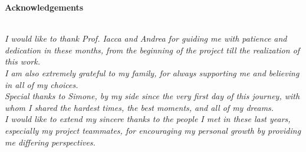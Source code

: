 \thispagestyle{empty}

\begin{center}
  {\bf \Huge Acknowledgements}
\end{center}

\vspace{4cm}

\emph{\\
I would like to thank Prof. Iacca and Andrea for guiding me with patience and dedication in these months, from the beginning of the project till the realization of this work.\\
I am also extremely grateful to my family, for always supporting me and believing in all of my choices.\\
Special thanks to Simone, by my side since the very first day of this journey, with whom I shared the hardest times, the best moments, and all of my dreams.\\
I would like to extend my sincere thanks to the people I met in these last years, especially my project teammates, for encouraging my personal growth by providing me differing perspectives.}

